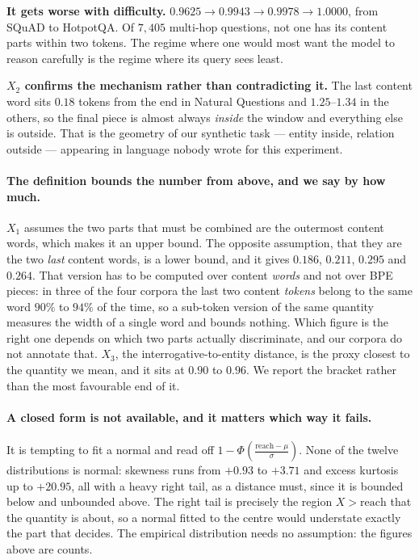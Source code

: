 \documentclass[10pt]{article}
\begin{document}
\textbf{It gets worse with difficulty.} $0.9625 \to 0.9943 \to 0.9978 \to 1.0000$, from SQuAD to
HotpotQA. Of $7{,}405$ multi-hop questions, not one has its content parts within two tokens. The
regime where one would most want the model to reason carefully is the regime where its query sees
least.

\textbf{$X_2$ confirms the mechanism rather than contradicting it.} The last content word sits
$0.18$ tokens from the end in Natural Questions and $1.25$--$1.34$ in the others, so the final piece
is almost always \emph{inside} the window and everything else is outside. That is the geometry of our
synthetic task --- entity inside, relation outside --- appearing in language nobody wrote for this
experiment.

\paragraph{The definition bounds the number from above, and we say by how much.} $X_1$ assumes the
two parts that must be combined are the outermost content words, which makes it an upper bound. The
opposite assumption, that they are the two \emph{last} content words, is a lower bound, and it gives
$0.186$, $0.211$, $0.295$ and $0.264$. That version has to be computed over content \emph{words} and
not over BPE pieces: in three of the four corpora the last two content \emph{tokens} belong to the
same word $90\%$ to $94\%$ of the time, so a sub-token version of the same quantity measures the width
of a single word and bounds nothing. Which figure is the right one depends on which two parts actually
discriminate, and our corpora do not annotate that. $X_3$, the interrogative-to-entity distance, is
the proxy closest to the quantity we mean, and it sits at $0.90$ to $0.96$. We report the bracket
rather than the most favourable end of it.

\paragraph{A closed form is not available, and it matters which way it fails.} It is tempting to fit
a normal and read off $1 - \Phi\!\left(\frac{\text{reach}-\mu}{\sigma}\right)$. None of the twelve
distributions is normal: skewness runs from $+0.93$ to $+3.71$ and excess kurtosis up to $+20.95$,
all with a heavy right tail, as a distance must, since it is bounded below and unbounded above. The
right tail is precisely the region $X > \text{reach}$ that the quantity is about, so a normal fitted
to the centre would understate exactly the part that decides. The empirical distribution needs no
assumption: the figures above are counts.
\end{document}
